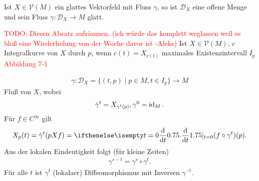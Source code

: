 \begin{Satz}\label{satz-4-9}
  Ist $X \in \mathcal V(M)$ ein glattes Vektorfeld mit Fluss $\gamma$, so ist $\mathcal D_X$ eine offene Menge und sein Fluss $\gamma \colon \mathcal D_X \to M$ glatt.
\end{Satz}



\begin{bem}[Erinnerung]
\textcolor{red}{TODO: Diesen Absatz aufräumen. (ich würde das komplett weglassen weil es bloß eine Wiederholung von der Woche davor ist -Aleks)}
Ist $X \in \mathcal V(M)$, $c$ Integralkurve von $X$ durch $p$, wenn $c(t) = X_{c(t)}$ maximales Existenzintervall $I_p$\\

\textcolor{red}{Abbildung 7-1}

\begin{align*}
	\gamma \colon \mathcal D_X = \{(t,p) \mid p \in M, t \in I_p\} \to M
\end{align*}
Fluß von $X$, wobei
\begin{align*}
	\dot \gamma^t = X_{\gamma^t(p)}, \gamma^0 = \operatorname{id}_M.
\end{align*}
Für $f \in C^{\infty}$ gilt
\begin{align*}
	X_p(t) = \dot \gamma^t(pXf) = \difffrac[t=0]{}{t}(f \circ \gamma^t)(p).
\end{align*}
Aus der lokalen Eindeutigkeit folgt (für kleine Zeiten)
\begin{align*}
	\gamma^{s-t} = \gamma^s \circ \gamma^t.
\end{align*}
Für alle $t$ ist $\gamma^t$ (lokalaer) Diffeomorphismus mit Inversen $\gamma^{-t}$.
\end{bem}

